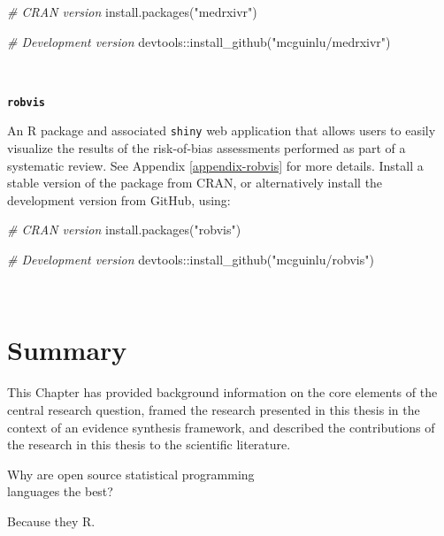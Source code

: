 \documentclass[a4paper, twoside]{templates/ociamthesis}
\newenvironment{Shaded}{\begin{snugshade}}{\end{snugshade}}
\newcommand{\CommentTok}[1]{\textcolor[rgb]{0.56,0.35,0.01}{\textit{#1}}}
\newcommand{\FunctionTok}[1]{\textcolor[rgb]{0.00,0.00,0.00}{#1}}
\newcommand{\NormalTok}[1]{#1}
\newcommand{\SpecialCharTok}[1]{\textcolor[rgb]{0.00,0.00,0.00}{#1}}
\newcommand{\StringTok}[1]{\textcolor[rgb]{0.31,0.60,0.02}{#1}}
\renewenvironment{Shaded}
{
  \vspace{4pt}%
  \begin{snugshade}%
}{%
  \end{snugshade}%
  \vspace{4pt}%
}
\begin{document}
\begin{Shaded}
\begin{Highlighting}[]
\CommentTok{\# CRAN version}
\FunctionTok{install.packages}\NormalTok{(}\StringTok{"medrxivr"}\NormalTok{)}

\CommentTok{\# Development version}
\NormalTok{devtools}\SpecialCharTok{::}\FunctionTok{install\_github}\NormalTok{(}\StringTok{"mcguinlu/medrxivr"}\NormalTok{)}
\end{Highlighting}
\end{Shaded}

~

\textbf{\texttt{robvis}}

An R package and associated \texttt{shiny} web application that allows users to easily visualize the results of the risk-of-bias assessments performed as part of a systematic review. See Appendix \ref{appendix-robvis} for more details. Install a stable version of the package from CRAN, or alternatively install the development version from GitHub, using:

\begin{Shaded}
\begin{Highlighting}[]
\CommentTok{\# CRAN version}
\FunctionTok{install.packages}\NormalTok{(}\StringTok{"robvis"}\NormalTok{)}

\CommentTok{\# Development version}
\NormalTok{devtools}\SpecialCharTok{::}\FunctionTok{install\_github}\NormalTok{(}\StringTok{"mcguinlu/robvis"}\NormalTok{)}
\end{Highlighting}
\end{Shaded}

~

\hypertarget{summary}{%
\section{Summary}\label{summary}}

This Chapter has provided background information on the core elements of the central research question, framed the research presented in this thesis in the context of an evidence synthesis framework, and described the contributions of the research in this thesis to the scientific literature.

\begin{savequote}
Why are open source statistical programming\\
languages the best?

Because they R.
\end{savequote}
\end{document}
